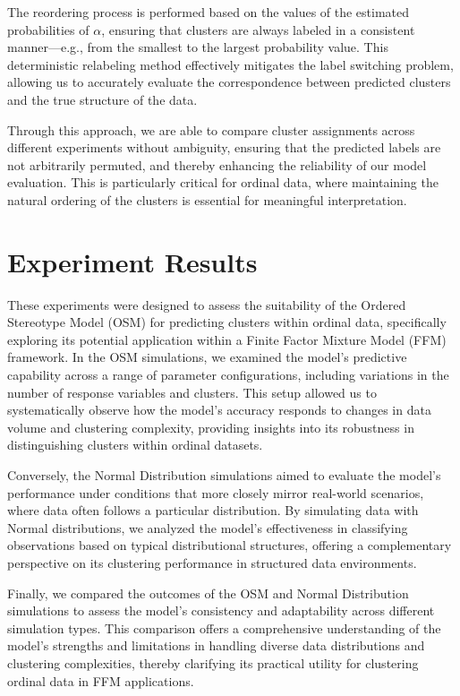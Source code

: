 \documentclass{article}
\begin{document}
The reordering process is performed based on the values of the estimated probabilities of 
$\alpha$, ensuring that clusters are always labeled in a consistent manner—e.g., 
from the smallest to the largest probability value. 
This deterministic relabeling method effectively mitigates the label switching problem, 
allowing us to accurately evaluate the correspondence between predicted clusters and the true structure of the data.

Through this approach, we are able to compare cluster assignments across different experiments without ambiguity, 
ensuring that the predicted labels are not arbitrarily permuted, and thereby enhancing the reliability of our model evaluation. 
This is particularly critical for ordinal data, where maintaining the natural ordering of the clusters is essential for meaningful interpretation.


\section{Experiment Results}

These experiments were designed to assess the suitability of the Ordered Stereotype Model (OSM) for predicting clusters within ordinal data, specifically exploring its potential application within a Finite Factor Mixture Model (FFM) framework. In the OSM simulations, we examined the model’s predictive capability across a range of parameter configurations, including variations in the number of response variables and clusters. This setup allowed us to systematically observe how the model's accuracy responds to changes in data volume and clustering complexity, providing insights into its robustness in distinguishing clusters within ordinal datasets.

Conversely, the Normal Distribution simulations aimed to evaluate the model’s performance under conditions that more closely mirror real-world scenarios, where data often follows a particular distribution. By simulating data with Normal distributions, we analyzed the model’s effectiveness in classifying observations based on typical distributional structures, offering a complementary perspective on its clustering performance in structured data environments.

Finally, we compared the outcomes of the OSM and Normal Distribution simulations to assess the model’s consistency and adaptability across different simulation types. This comparison offers a comprehensive understanding of the model’s strengths and limitations in handling diverse data distributions and clustering complexities, thereby clarifying its practical utility for clustering ordinal data in FFM applications.
\end{document}
